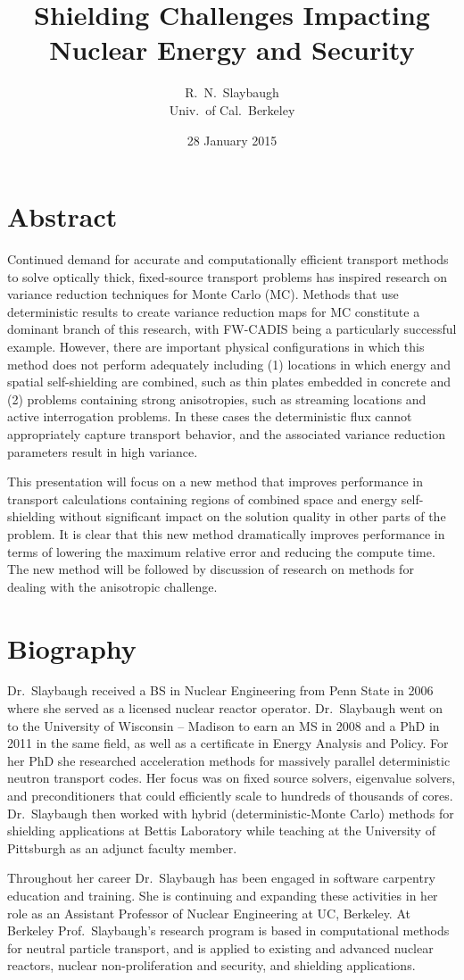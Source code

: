 \documentclass[12pt]{article}
\title{Shielding Challenges Impacting Nuclear Energy and Security}
\author{R.\ N.\ Slaybaugh \\ Univ.\ of Cal.\ Berkeley}
\date{28 January 2015}
\begin{document}
\maketitle

\section*{Abstract}

Continued demand for accurate and computationally efficient transport methods to solve optically thick, fixed-source transport problems has inspired research on variance reduction techniques for Monte Carlo (MC). Methods that use deterministic results to create variance reduction maps for MC constitute a dominant branch of this research, with FW-CADIS being a particularly successful example. However, there are important physical configurations in which this method does not perform adequately including (1) locations in which energy and spatial self-shielding are combined, such as thin plates embedded in concrete and (2) problems containing strong anisotropies, such as streaming locations and active interrogation problems. In these cases the deterministic flux cannot appropriately capture transport behavior, and the associated variance reduction parameters result in high variance. 

This presentation will focus on a new method that improves performance in transport calculations containing regions of combined space and energy self-shielding without significant impact on the solution quality in other parts of the problem. It is clear that this new method dramatically improves performance in terms of lowering the maximum relative error and reducing the compute time. The new method will be followed by discussion of research on methods for dealing with the anisotropic challenge.

\section*{Biography}
Dr.\ Slaybaugh received a BS in Nuclear Engineering from Penn State in 2006 where she served as a licensed nuclear reactor operator. Dr.\ Slaybaugh went on to the University of Wisconsin -- Madison to earn an MS in 2008 and a PhD in 2011 in the same field, as well as a certificate in Energy Analysis and Policy. For her PhD she researched acceleration methods for massively parallel deterministic neutron transport codes. Her focus was on fixed source solvers, eigenvalue solvers, and preconditioners that could efficiently scale to hundreds of thousands of cores. Dr.\ Slaybaugh then worked with hybrid (deterministic-Monte Carlo) methods for shielding applications at Bettis Laboratory while teaching at the University of Pittsburgh as an adjunct faculty member. 

Throughout her career Dr.\ Slaybaugh has been engaged in software carpentry education and training. She is continuing and expanding these activities in her role as an Assistant Professor of Nuclear Engineering at UC, Berkeley. At Berkeley Prof.\ Slaybaugh's research program is based in computational methods for neutral particle transport, and is applied to existing and advanced nuclear reactors, nuclear non-proliferation and security, and shielding applications. 
\end{document}
